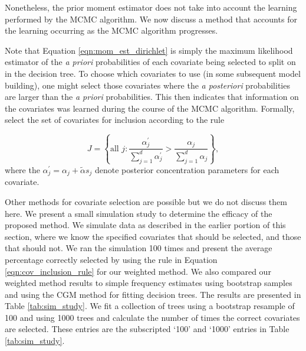 Nonetheless, the prior moment estimator does not take into account the learning performed by the MCMC algorithm. We now discuss a method that accounts for the learning occurring as the MCMC algorithm progresses.

Note that Equation \ref{eqn:mom_est_dirichlet} is simply the maximum likelihood estimator of the \emph{a priori} probabilities of each covariate being selected to split on in the decision tree. To choose which covariates to use (in some subsequent model building), one might select those covariates where the \emph{a posteriori} probabilities are larger than the \emph{a priori} probabilities. This then indicates that information on the covariates was learned during the course of the MCMC algorithm. Formally, select the set of covariates for inclusion according to the rule 

\begin{equation}\label{eqn:cov_inclusion_rule}
 J = \left\{ \text{all } j:\frac{\alpha^\prime_j}{\sum_{j=1}^d\alpha^\prime_j}>  \frac{\alpha_j}{\sum_{j=1}^d\alpha_j } \right\},
\end{equation}
where the $\alpha_j^\prime = \alpha_j +\widetilde{\alpha}s_j$ denote posterior concentration parameters for each covariate.
 
 Other methods for covariate selection are possible but we do not discuss them here. 
We present a small simulation study to determine the efficacy of the proposed method. We simulate data as described in the earlier portion of this section, where we know the specified covariates that should be selected, and those that should not. We ran the simulation 100 times and present the average percentage correctly selected by using the rule in Equation \ref{eqn:cov_inclusion_rule} for our weighted method. We also compared our weighted method results to simple frequency estimates using bootstrap samples and using the CGM method for fitting decision trees. The results are presented in Table \ref{tab:sim_study}. We fit a collection of trees using a bootstrap resample of 100 and using 1000 trees and calculate the number of times the correct covariates are selected. These entries are the subscripted `100' and `1000' entries in Table \ref{tab:sim_study}. 

%

